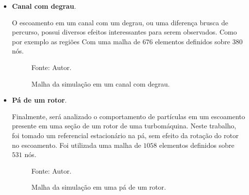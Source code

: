 \begin{itemize}
    \item \textbf{Canal com degrau}.

        O escoamento em um canal com um degrau, ou uma diferença brusca de percurso, possui diversos efeitos interessantes para serem observados.
        Como por exemplo as regiões 
        Com uma malha de $676$ elementos definidos sobre $380$ nós.
        \begin{figure}[H]
            \centering
             {\raggedleft \scriptsize Fonte: Autor.}
            \caption{Malha da simulação em um canal com degrau.}
            \label{step_mesh}
        \end{figure}

    \item \textbf{Pá de um rotor}.

        Finalmente, será analizado o comportamento de partículas em um escoamento presente em uma seção de um rotor de uma turbomáquina.
        Neste trabalho, foi tomado um referencial estacionário na pá, sem efeito da rotação do rotor no escoamento.
        Foi utilizada uma malha de $1058$ elementos definidos sobre $531$ nós.
        \begin{figure}[H]
            \centering
             {\raggedleft \scriptsize Fonte: Autor.}
            \caption{Malha da simulação em uma pá de um rotor.}
            \label{rotor_mesh}
        \end{figure}
\end{itemize}

